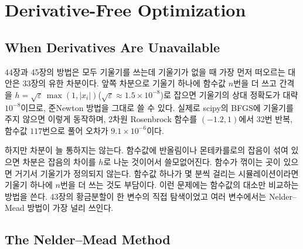 \chapter{Derivative-Free Optimization}
\label{ch:derivative-free}


\section{When Derivatives Are Unavailable}
\label{sec:no-derivatives}

44장과 45장의 방법은 모두 기울기를 쓰는데 기울기가 없을 때 가장 먼저 떠오르는 대안은 33장의 유한 차분이다. 앞쪽 차분으로 기울기 하나에 함수값 $n$번을 더 쓰고 간격을 $h=\sqrt\varepsilon\,\max(1,|x_i|)$($\sqrt\varepsilon\approx1.5\times10^{-8}$)로 잡으면 기울기의 상대 정확도가 대략 $10^{-8}$이므로, 준Newton 방법을 그대로 쓸 수 있다. 실제로 scipy의 BFGS에 기울기를 주지 않으면 이렇게 동작하며, 2차원 Rosenbrock 함수를 $(-1.2,1)$에서 $32$번 반복, 함수값 $117$번으로 풀어 오차가 $9.1\times10^{-6}$이다.

하지만 차분이 늘 통하지는 않는다. 함수값에 반올림이나 몬테카를로의 잡음이 섞여 있으면 차분은 잡음의 차이를 $h$로 나눈 것이어서 쓸모없어진다. 함수가 꺾이는 곳이 있으면 거기서 기울기가 정의되지 않는다. 함수값 하나가 몇 분씩 걸리는 시뮬레이션이라면 기울기 하나에 $n$번을 더 쓰는 것도 부담이다. 이런 문제에는 함수값의 대소만 비교하는  방법을 쓴다. 43장의 황금분할이 한 변수의 직접 탐색이었고 여러 변수에서는 Nelder--Mead 방법이 가장 널리 쓰인다.

\section{The Nelder--Mead Method}
\label{sec:nelder-mead}


